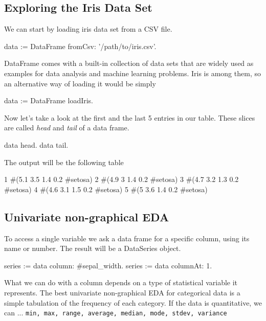 \documentclass{article}
\begin{document}
\begin{multicols}{2}
\section{Exploring the Iris Data Set}
\label{sec:contribution}
%
%

We can start by loading iris data set from a CSV file.
\begin{code}{}
data := DataFrame fromCsv: '/path/to/iris.csv'.
\end{code}

DataFrame comes with a built-in collection of data sets that are widely used as examples for data analysis and machine learning problems. Iris is among them, so an alternative way of loading it would be simply

\begin{code}{}
data := DataFrame loadIris.
\end{code}

Now let's take a look at the first and the last 5 entries in our table. These slices are called \textit{head} and \textit{tail} of a data frame.

\begin{code}{}
data head.
data tail.
\end{code}

The output will be the following table
\begin{code}{}
1   #(5.1 3.5 1.4 0.2 #setosa)
2	  #(4.9 3 1.4 0.2 #setosa)
3	  #(4.7 3.2 1.3 0.2 #setosa)
4	  #(4.6 3.1 1.5 0.2 #setosa)
5	  #(5 3.6 1.4 0.2 #setosa)

\end{code}

\subsection{Univariate non-graphical EDA}
To access a single variable we ask a data frame for a specific column, using its name or number. The result will be a DataSeries object.

\begin{code}{}
series := data column: #sepal_width.
series := data columnAt: 1.
\end{code}

What we can do with a column depends on a type of statistical variable it represents. The best univariate non-graphical EDA for categorical data is a simple tabulation of the frequency of each category\cite{Seltman}. If the data is quantitative, we can ...
\texttt{min, max, range, average, median, mode, stdev, variance}


\end{multicols}
\end{document}
